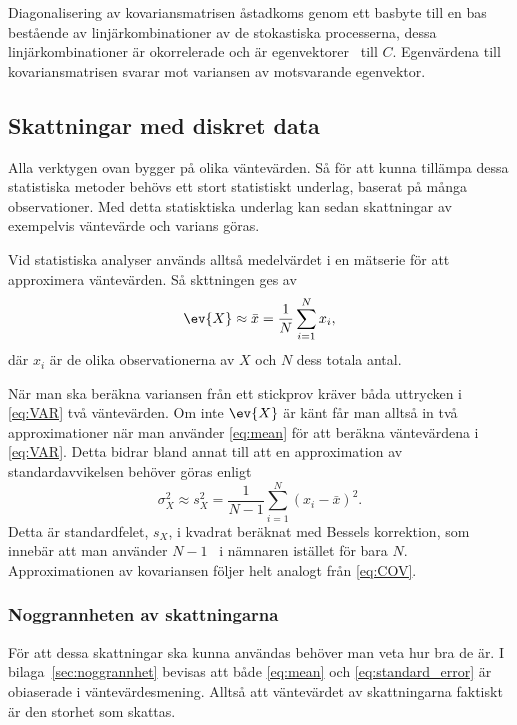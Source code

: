 Diagonalisering av kovariansmatrisen åstadkoms genom ett basbyte till en bas bestående av linjärkombinationer av de stokastiska processerna, dessa linjärkombinationer är okorrelerade och är egenvektorer~\cite{Shlens_PCA2014} till $C$. Egenvärdena till kovariansmatrisen svarar mot variansen av motsvarande egenvektor.


\subsection{Skattningar med diskret data} \label{sec:diskret_data}
Alla verktygen ovan bygger på olika väntevärden. Så för att kunna tillämpa dessa statistiska metoder behövs ett stort statistiskt underlag, baserat på många observationer. Med detta statisktiska underlag kan sedan skattningar av exempelvis väntevärde och varians göras.

Vid statistiska analyser används alltså medelvärdet i en mätserie för att approximera väntevärden. Så skttningen ges av
\begin{equation}\label{eq:mean}
\ev{X} \approx \bar{x} = \frac{1}{N} \sum_{i=1}^N x_i,
\end{equation}
där $x_i$ är de olika observationerna av $X$ och $N$ dess totala antal. 

När man ska beräkna variansen från ett stickprov kräver båda uttrycken i \eqref{eq:VAR} två väntevärden. Om inte $\ev{X}$ är känt får man alltså in två approximationer när man använder \eqref{eq:mean} för att beräkna väntevärdena i \eqref{eq:VAR}. Detta bidrar bland annat till att en approximation av standardavvikelsen behöver göras enligt
\begin{equation}\label{eq:standard_error}
\sigma_X^2 \approx s_X^2
=  \frac{1}{N-1} \sum_{i=1}^N \left(x_i-\bar{x}\right)^2.
\end{equation}
Detta är standardfelet, $s_X$, i kvadrat beräknat med Bessels korrektion, som innebär att man använder $N-1$~\cite{Rice_matstat2006} i nämnaren istället för bara $N$. Approximationen av kovariansen följer helt analogt från \eqref{eq:COV}.

\subsubsection{Noggrannheten av skattningarna}
För att dessa skattningar ska kunna användas behöver man veta hur bra de är. I bilaga~\ref{sec:noggrannhet} bevisas att både \eqref{eq:mean} och \eqref{eq:standard_error} är obiaserade i väntevärdesmening. Alltså att väntevärdet av skattningarna faktiskt är den storhet som skattas.


